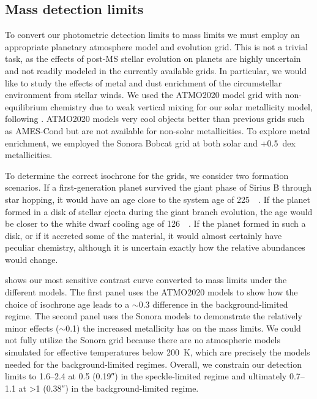 \documentclass[twocolumn]{aastex631}
\begin{document}
\subsection{Mass detection limits}\label{sec:mass-limits}

To convert our photometric detection limits to mass limits we must employ an appropriate planetary atmosphere model and evolution grid. This is not a trivial task, as the effects of post-MS stellar evolution on planets are highly uncertain and not readily modeled in the currently available grids. In particular, we would like to study the effects of metal and dust enrichment of the circumstellar environment from stellar winds. We used the ATMO2020 model grid \citep{phillipsNewSetAtmosphere2020a} with non-equilibrium chemistry due to weak vertical mixing for our solar metallicity model, following \citet{pathakHighContrastImaging2021}. ATMO2020 models very cool objects better than previous grids such as AMES-Cond \citep{allardModelsVerylowmassStars2012} but are not available for non-solar metallicities. To explore metal enrichment, we employed the Sonora Bobcat grid \citep{marleySonoraBobcatCloudfree2021,marleySonoraBrownDwarf2021} at both solar and +\qty{0.5}{dex} metallicities.

To determine the correct isochrone for the grids, we consider two formation scenarios. If a first-generation planet survived the giant phase of Sirius B through star hopping, it would have an age close to the system age of \qty{225}{\mega\year}. If the planet formed in a disk of stellar ejecta during the giant branch evolution, the age would be closer to the white dwarf cooling age of \qty{126}{\mega\year}. If the planet formed in such a disk, or if it accreted some of the material, it would almost certainly have peculiar chemistry, although it is uncertain exactly how the relative abundances would change.

 shows our most sensitive contrast curve converted to mass limits under the different models. The first panel uses the ATMO2020 models to show how the choice of isochrone age leads to a $\sim$\qty{0.3}{\jupitermass} difference in the background-limited regime. The second panel uses the Sonora models to demonstrate the relatively minor effects ($\sim$\qty{0.1}{\jupitermass}) the increased metallicity has on the mass limits. We could not fully utilize the Sonora grid because there are no atmospheric models simulated for effective temperatures below \qty{200}{\kelvin}, which are precisely the models needed for the background-limited regimes. Overall, we constrain our detection limits to \qtyrange{1.6}{2.4}{\jupitermass} at \qty{0.5}{\au} (\ang{;;0.19}) in the speckle-limited regime and ultimately \qtyrange{0.7}{1.1}{\jupitermass} at \textgreater\qty{1}{\au} (\ang{;;0.38}) in the background-limited regime.
\end{document}
